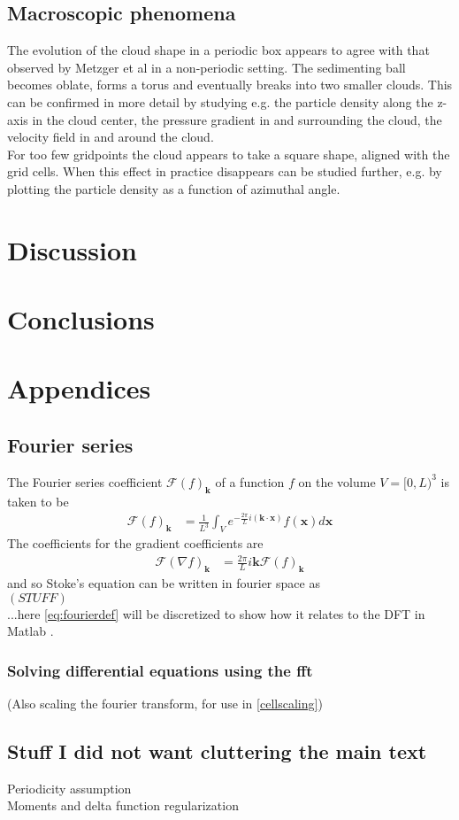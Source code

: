 \documentclass[a4paper,twoside=false,abstract=false,numbers=noenddot,
titlepage=false,headings=small,parskip=half,version=last]{scrartcl}
\begin{document}
\subsection{Macroscopic phenomena}
The evolution of the cloud shape in a periodic box appears to agree with that observed by Metzger et al \cite{fallingclouds} in a non-periodic setting. The sedimenting ball becomes oblate, forms a torus and eventually breaks into two smaller clouds. This can be confirmed in more detail by studying e.g. the particle density along the z-axis in the cloud center, the pressure gradient in and surrounding the cloud, the velocity field in and around the cloud.\\
For too few gridpoints the cloud appears to take a square shape, aligned with the grid cells. When this effect in practice disappears can be studied further, e.g. by plotting the particle density as a function of azimuthal angle.\\

\section{Discussion}

\section{Conclusions}





\section{Appendices}
\subsection{Fourier series}
The Fourier series coefficient $\mathcal{F}(f)_{\mathbf{k}}$ of a function $f$ on the volume $V=[0,L)^3$ is taken to be
\begin{align}
\mathcal{F}(f)_{\mathbf{k}} &= \frac{1}{L^3} \int_V e^{-\frac{2\pi}{L}i(\mathbf{k}\cdot \mathbf{x})}f(\mathbf{x})d\mathbf{x}
    \label{eq:fourierdef}
\end{align}
The coefficients for the gradient coefficients are
\begin{align}
\mathcal{F}(\nabla f)_{\mathbf{k}} &= \frac{2\pi}{L}i\mathbf{k} \mathcal{F}(f)_{\mathbf{k}}
\end{align}
and so Stoke's equation can be written in fourier space as \\
$\left(STUFF\right)$\\
...here \eqref{eq:fourierdef} will be discretized to show how it relates to the DFT in Matlab \cite{matlab}.

\subsubsection{Solving differential equations using the fft}
(Also scaling the fourier transform, for use in \ref{cellscaling})
\subsection{Stuff I did not want cluttering the main text}
Periodicity assumption\\
Moments and delta function regularization
\end{document}
